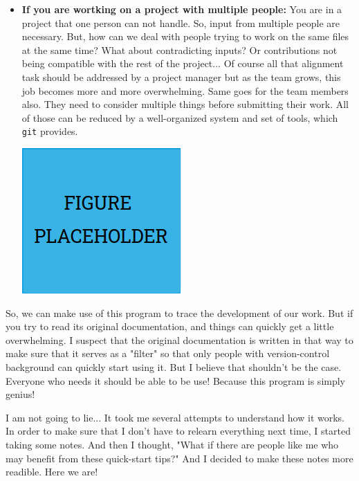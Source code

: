 \documentclass{article}
\begin{document}
\begin{itemize}
            \item \textbf{If you are wortking on a project with multiple people:} You are in a project that one person can not handle. So, input from multiple people are necessary. But, how can we deal with people trying to work on the same files at the same time? What about contradicting inputs? Or contributions not being compatible with the rest of the project... Of course all that alignment task should be addressed by a project manager but as the team grows, this job becomes more and more overwhelming. Same goes for the team members also. They need to consider multiple things before submitting their work. All of those can be reduced by a well-organized system and set of tools, which \texttt{git} provides.\par
                \begin{minipage}{\linewidth}
                    \centering
                    \includegraphics*[scale=0.3]{./Figures/Figure_Placeholder.png}
                    \captionsetup{type=figure}
                    \label{fig:GIT_ProjectWithMultiplePeople}
                \end{minipage} 
    
        \end{itemize}
        
        So, we can make use of this program to trace the development of our work. But if you try to read its original documentation, and things can quickly get a little overwhelming. I suspect that the original documentation is written in that way to make sure that it serves as a "filter" so that only people with version-control background can quickly start using it. But I believe that shouldn't be the case. Everyone who needs it should be able to be use! Because this program is simply genius!\par 

        I am not going to lie... It took me several attempts to understand how it works. In order to make sure that I don't have to relearn everything next time, I started taking some notes. And then I thought, "What if there are people like me who may benefit from these quick-start tips?" And I decided to make these notes more readible. Here we are!
\end{document}
